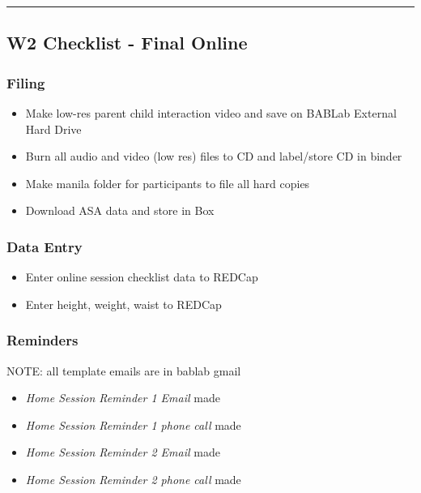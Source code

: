 \documentclass[
]{book}
\providecommand{\tightlist}{%
  \setlength{\itemsep}{0pt}\setlength{\parskip}{0pt}}
\begin{document}
\begin{center}\rule{0.5\linewidth}{0.5pt}\end{center}

\hypertarget{w2-checklist---final-online}{%
\subsection{W2 Checklist - Final Online}\label{w2-checklist---final-online}}

\hypertarget{filing-6}{%
\subsubsection{Filing}\label{filing-6}}

\begin{itemize}
\tightlist
\item
  Make low-res parent child interaction video and save on BABLab External Hard Drive
\item
  Burn all audio and video (low res) files to CD and label/store CD in binder
\item
  Make manila folder for participants to file all hard copies
\item
  Download ASA data and store in Box
\end{itemize}

\hypertarget{data-entry-4}{%
\subsubsection{Data Entry}\label{data-entry-4}}

\begin{itemize}
\tightlist
\item
  Enter online session checklist data to REDCap
\item
  Enter height, weight, waist to REDCap
\end{itemize}

\hypertarget{reminders-4}{%
\subsubsection{Reminders}\label{reminders-4}}

NOTE: all template emails are in bablab gmail

\begin{itemize}
\tightlist
\item
  \emph{Home Session Reminder 1 Email} made
\item
  \emph{Home Session Reminder 1 phone call} made
\item
  \emph{Home Session Reminder 2 Email} made
\item
  \emph{Home Session Reminder 2 phone call} made
\end{itemize}
\end{document}
